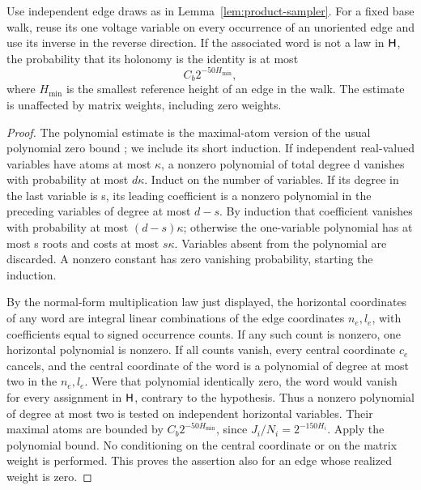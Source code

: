 \begin{lemma}
\label{lem:polynomial-avoidance}
Use independent edge draws as in Lemma~\ref{lem:product-sampler}.
For a fixed base walk, reuse its one voltage
variable on every occurrence of an unoriented edge and use its inverse in the
reverse direction.  If the associated word is not a law in \(\mathsf H\), the
probability that its holonomy is the identity is at most
\[
 C_b2^{-50H_{\min}},
\]
where \(H_{\min}\) is the smallest reference height of an edge in the walk.
The estimate is unaffected by matrix weights, including zero weights.
\end{lemma}

\begin{proof}
The polynomial estimate is the maximal-atom version of the usual polynomial
zero bound \cite[Lemma~1]{Schwartz80}; we include its short induction.
If independent real-valued variables have atoms at most \(\kappa\), a
nonzero polynomial of total degree d vanishes with probability at most
\(d\kappa\).  Induct on the number of variables.  If its degree in the last
variable is s, its leading coefficient is a nonzero polynomial in the preceding
variables of degree at most \(d-s\).  By induction that coefficient vanishes
with probability at most \((d-s)\kappa\); otherwise the one-variable polynomial
has at most s roots and costs at most \(s\kappa\).  Variables absent from the
polynomial are discarded.  A nonzero constant has zero vanishing probability,
starting the induction.

By the normal-form multiplication law just displayed, the horizontal
coordinates of any word are integral linear combinations of the edge
coordinates \(n_e,l_e\), with coefficients equal to signed occurrence counts.
If any such count is nonzero, one horizontal polynomial is nonzero.  If all
counts vanish, every central coordinate \(c_e\) cancels, and the central
coordinate of the word is a polynomial of degree at most two in the
\(n_e,l_e\).  Were that polynomial identically zero, the word would vanish for
every assignment in \(\mathsf H\), contrary to the hypothesis.  Thus a nonzero
polynomial of degree at most two is tested on independent horizontal variables.
Their maximal atoms are bounded by \(C_b2^{-50H_{\min}}\), since
\(J_i/N_i=2^{-150H_i}\).  Apply the polynomial bound.  No conditioning on the
central coordinate or on the matrix weight is performed.  This proves the
assertion also for an edge whose realized weight is zero.
\end{proof}

